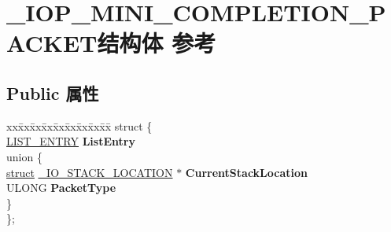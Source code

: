 \hypertarget{struct___i_o_p___m_i_n_i___c_o_m_p_l_e_t_i_o_n___p_a_c_k_e_t}{}\section{\+\_\+\+I\+O\+P\+\_\+\+M\+I\+N\+I\+\_\+\+C\+O\+M\+P\+L\+E\+T\+I\+O\+N\+\_\+\+P\+A\+C\+K\+E\+T结构体 参考}
\label{struct___i_o_p___m_i_n_i___c_o_m_p_l_e_t_i_o_n___p_a_c_k_e_t}
\subsection*{Public 属性}
\begin{DoxyCompactItemize}
\item 
\mbox{\label{struct___i_o_p___m_i_n_i___c_o_m_p_l_e_t_i_o_n___p_a_c_k_e_t_aa5dbf05bc4bbeda507ce2dcb9c63a7b1}} 
\begin{tabbing}
xx\=xx\=xx\=xx\=xx\=xx\=xx\=xx\=xx\=\kill
struct \{\\
\>\hyperlink{struct___l_i_s_t___e_n_t_r_y}{LIST\_ENTRY} {\bfseries ListEntry}\\
\mbox{\label{struct___i_o_p___m_i_n_i___c_o_m_p_l_e_t_i_o_n___p_a_c_k_e_t_1_1_0D1433_aebcf61882fd551a648642ad78a057ffc}} 
\>union \{\\
\>\>\hyperlink{interfacestruct}{struct} \hyperlink{struct___i_o___s_t_a_c_k___l_o_c_a_t_i_o_n}{\_IO\_STACK\_LOCATION} $\ast$ {\bfseries CurrentStackLocation}\\
\>\>ULONG {\bfseries PacketType}\\
\>\} \\
\}; \\


\end{tabbing}
\end{DoxyCompactItemize}
